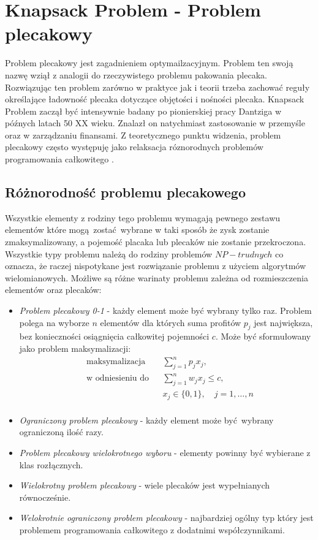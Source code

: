 \section{Knapsack Problem - Problem plecakowy}
Problem plecakowy jest zagadnieniem optymailzacyjnym. Problem ten swoją nazwę wziął z analogii do rzeczywistego problemu pakowania plecaka. Rozwiązując ten problem zarówno w praktyce jak i teorii trzeba zachować reguły określające ładowność plecaka dotyczące objętości i nośności plecaka. Knapsack Problem zaczął być intensywnie badany po pionierskiej pracy Dantziga \cite{DantzigArticle} w późnych latach 50 XX wieku. Znalazł on natychmiast zastosowanie w przemyśle oraz w zarządzaniu finansami. Z teoretycznego punktu widzenia, problem plecakowy często występuję jako relaksacja róznorodnych problemów programowania całkowitego \cite{PisingerThesis}.
\subsection{Różnorodność problemu plecakowego}
Wszystkie elementy z rodziny tego problemu wymagają pewnego zestawu elementów które mogą zostać wybrane w taki sposób że zysk zostanie zmaksymalizowany, a pojemość placaka lub plecaków nie zostanie przekroczona. Wszystkie typy problemu należą do rodziny problemów $NP-trudnych$ co oznacza, że raczej nispotykane jest rozwiązanie problemu z użyciem algorytmów wielomianowych. Możliwe są różne warinaty problemu zależna od rozmieszczenia elementów oraz plecaków:
\begin{itemize}
  \item \textit{Problem plecakowy 0-1} - każdy element może być wybrany tylko raz. Problem polega na wyborze $n$ elementów dla których suma profitów $p_j$ jest największa, bez konieczności osiągnięcia całkowitej pojemności $c$. Może być sformułowany jako problem maksymalizacji:
  \begin{equation}
    \begin{aligned}\label{01knapsack}
      & \textrm{maksymalizacja} & & \sum_{j=1}^n p_jx_j, \\
      & \textrm{w odniesieniu do} & & \sum_{j=1}^n w_jx_j \le c, \\
      &&& x_j \in \{0,1\},\quad j = 1,\dots,n \\
    \end{aligned}
  \end{equation}
  \item \textit{Ograniczony problem plecakowy} - każdy element może być wybrany ograniczoną ilość razy.
  \item \textit{Problem plecakowy wielokrotnego wyboru} - elementy powinny być wybierane z klas rozłącznych.
  \item \textit{Wielokrotny problem plecakowy} - wiele plecaków jest wypełnianych równocześnie.
  \item \textit{Welokrotnie ograniczony problem plecakowy} - najbardziej ogólny typ który jest problemem programowania całkowitego z dodatnimi współczynnikami.
\end{itemize}

